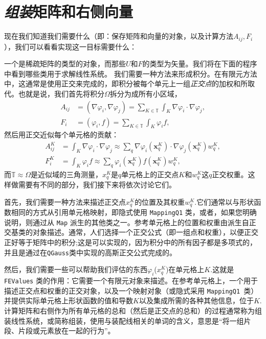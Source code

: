 \documentclass[12pt, a4paper]{article}
\numberwithin{equation}{section} %
\begin{document}
\newpage
\section{\textit{组装}矩阵和右侧向量}

现在我们知道我们需要什么（即：保存矩阵和向量的对象，以及计算方法$A_{ij},F_i$），我们可以看看实现这一目标需要什么：

一个是稀疏矩阵的类型的对象，而那些$U$和$F$的类型为矢量。我们将在下面的程序中看到哪些类用于求解线性系统。
我们需要一种方法来形成积分。在有限元方法中，这通常是使用正交来完成的，即积分被每个单元上一组\textit{正交点}的加权和所取代。也就是说，我们首先将积分$\Omega$拆分为成所有小区域，
\begin{align*} A_{ij} &= (\nabla\varphi_i, \nabla \varphi_j) = \sum_{K \in {\mathbb T}} \int_K \nabla\varphi_i \cdot \nabla \varphi_j, \\ F_i &= (\varphi_i, f) = \sum_{K \in {\mathbb T}} \int_K \varphi_i f, \end{align*}
然后用正交近似每个单元格的贡献：
\begin{align*} A^K_{ij} &= \int_K \nabla\varphi_i \cdot \nabla \varphi_j \approx \sum_q \nabla\varphi_i(\mathbf x^K_q) \cdot \nabla \varphi_j(\mathbf x^K_q) w_q^K, \\ F^K_i &= \int_K \varphi_i f \approx \sum_q \varphi_i(\mathbf x^K_q) f(\mathbf x^K_q) w^K_q, \end{align*}
而$\mathbb{T} \approx \Omega$是近似域的三角测量，$x^K_q$是$q$单元格上的正交点$K$和$w^K_q$这$q$正交权重。这样做需要有不同的部分，我们接下来将依次讨论它们。

首先，我们需要一种方法来描述正交点$x^K_q$的位置及其权重$w^K_q$.它们通常以与形状函数相同的方式从引用单元格映射，即隐式使用 \verb|MappingQ1| 类，或者，如果您明确说明，则通过从 \verb|Map| 派生的其他类之一。参考单元格上的位置和权重由派生自正交基类的对象描述。通常，人们选择一个正交公式（即一组点和权重），以便正交正好等于矩阵中的积分;这是可以实现的，因为积分中的所有因子都是多项式的，并且是通过在\verb|QGauss|类中实现的高斯正交公式完成的。

然后，我们需要一些可以帮助我们评估的东西$\varphi_i$($x^K_q$)在单元格上$K$.这就是 \verb|FEValues| 类的作用：它需要一个有限元对象来描述。在参考单元格上，一个用于描述正交点和权重的正交对象，以及一个映射对象（或隐式采用 \verb|MappingQ1 |类）并提供实际单元格上形状函数的值和导数$K$以及集成所需的各种其他信息，位于$K$.
计算矩阵和右侧作为所有单元格的总和（然后是正交点的总和）的过程通常称为组装线性系统，或简称组装，使用与装配线相关的单词的含义，意思是“将一组片段、片段或元素放在一起的行为”。
\end{document}
